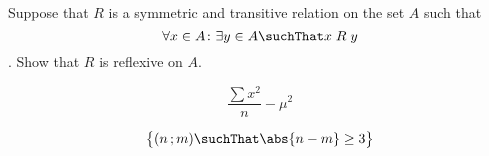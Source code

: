 \documentclass{article}
\begin{document}
  Suppose that $R$ is a symmetric and transitive relation on the set
  $A$ such that \[\forall{x \in A} \colon \exists{y \in A} \suchThat
  x\mathrel{R}y\]. Show that $R$ is reflexive on $A$.

\begin{displaymath}
\frac{\sum x^2}{n} - \mu^2
\end{displaymath}

\begin{displaymath}
\bigl{\lbrace} (n\,;m) \suchThat \abs{n - m} \geq 3 \bigr{\rbrace}
\end{displaymath}
\end{document}
